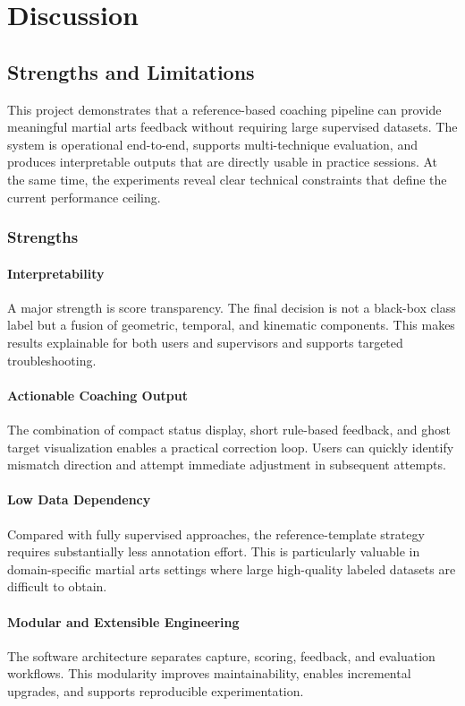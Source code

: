\documentclass[12pt]{article}
\begin{document}
{\section{Discussion}
\subsection{Strengths and Limitations}

This project demonstrates that a reference-based coaching pipeline can provide meaningful martial arts feedback without requiring large supervised datasets. The system is operational end-to-end, supports multi-technique evaluation, and produces interpretable outputs that are directly usable in practice sessions. At the same time, the experiments reveal clear technical constraints that define the current performance ceiling.

\subsubsection{Strengths}

\paragraph{Interpretability}
A major strength is score transparency. The final decision is not a black-box class label but a fusion of geometric, temporal, and kinematic components. This makes results explainable for both users and supervisors and supports targeted troubleshooting.

\paragraph{Actionable Coaching Output}
The combination of compact status display, short rule-based feedback, and ghost target visualization enables a practical correction loop. Users can quickly identify mismatch direction and attempt immediate adjustment in subsequent attempts.

\paragraph{Low Data Dependency}
Compared with fully supervised approaches, the reference-template strategy requires substantially less annotation effort. This is particularly valuable in domain-specific martial arts settings where large high-quality labeled datasets are difficult to obtain.

\paragraph{Modular and Extensible Engineering}
The software architecture separates capture, scoring, feedback, and evaluation workflows. This modularity improves maintainability, enables incremental upgrades, and supports reproducible experimentation.

}
\end{document}

